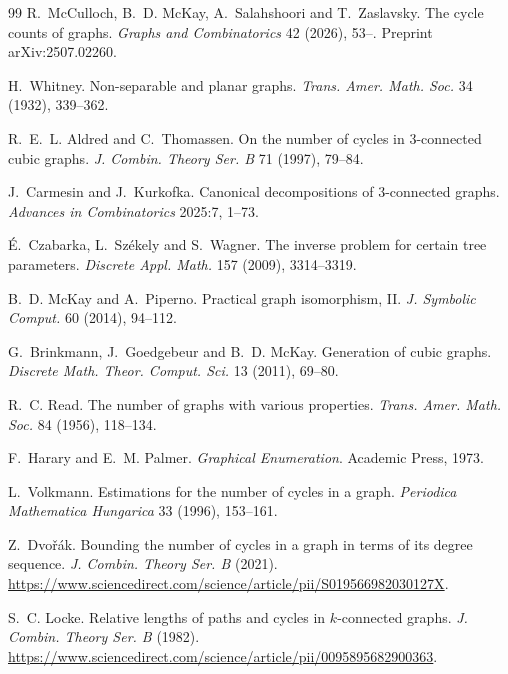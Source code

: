 \documentclass[11pt,a4paper]{article}
\theoremstyle{definition}
\begin{document}
\begin{thebibliography}{99}
\small
{}
R.~McCulloch, B.~D. McKay, A.~Salahshoori and T.~Zaslavsky.
\newblock The cycle counts of graphs.
\newblock \emph{Graphs and Combinatorics} 42 (2026), 53--.
\newblock Preprint arXiv:2507.02260.

H.~Whitney.
\newblock Non-separable and planar graphs.
\newblock \emph{Trans. Amer. Math. Soc.} 34 (1932), 339--362.

R.~E.~L. Aldred and C.~Thomassen.
\newblock On the number of cycles in $3$-connected cubic graphs.
\newblock \emph{J. Combin. Theory Ser. B} 71 (1997), 79--84.

J.~Carmesin and J.~Kurkofka.
\newblock Canonical decompositions of $3$-connected graphs.
\newblock \emph{Advances in Combinatorics} 2025:7, 1--73.

\'E.~Czabarka, L.~Sz\'ekely and S.~Wagner.
\newblock The inverse problem for certain tree parameters.
\newblock \emph{Discrete Appl. Math.} 157 (2009), 3314--3319.

B.~D. McKay and A.~Piperno.
\newblock Practical graph isomorphism, II.
\newblock \emph{J. Symbolic Comput.} 60 (2014), 94--112.

G.~Brinkmann, J.~Goedgebeur and B.~D. McKay.
\newblock Generation of cubic graphs.
\newblock \emph{Discrete Math. Theor. Comput. Sci.} 13 (2011), 69--80.

R.~C. Read.
\newblock The number of graphs with various properties.
\newblock \emph{Trans. Amer. Math. Soc.} 84 (1956), 118--134.

F.~Harary and E.~M. Palmer.
\newblock \emph{Graphical Enumeration}.
\newblock Academic Press, 1973.

L.~Volkmann.
\newblock Estimations for the number of cycles in a graph.
\newblock \emph{Periodica Mathematica Hungarica} 33 (1996), 153--161.

Z.~Dvo\v{r}\'ak.
\newblock Bounding the number of cycles in a graph in terms of its degree
  sequence.
\newblock \emph{J. Combin. Theory Ser. B} (2021).
\newblock \url{https://www.sciencedirect.com/science/article/pii/S019566982030127X}.

S.~C. Locke.
\newblock Relative lengths of paths and cycles in $k$-connected graphs.
\newblock \emph{J. Combin. Theory Ser. B} (1982).
\newblock \url{https://www.sciencedirect.com/science/article/pii/0095895682900363}.


\end{thebibliography}
\end{document}
